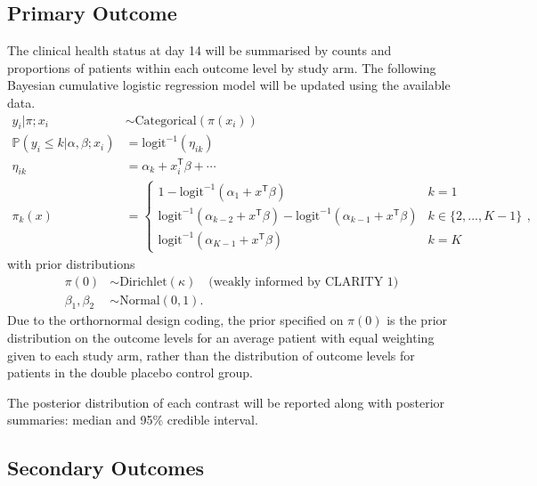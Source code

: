 \documentclass[11pt,parskip=full-]{scrartcl}
\begin{document}
\subsection{Primary Outcome}
The clinical health status at day 14 will be summarised by counts and proportions of patients within each outcome level by study arm. The following Bayesian cumulative logistic regression model will be updated using the available data.
$$
    \begin{aligned}
        y_{i} | \pi;x_i                            & \sim \text{Categorical}(\pi(x_i))           \\
        \mathbb P(y_i \leq k | \alpha, \beta; x_i) & = \text{logit}^{-1}(\eta_{ik})              \\
        \eta_{ik}                                  & = \alpha_k + x_i^{\mathsf{T}}\beta + \cdots \\
        \pi_k(x)                                   & = \begin{cases}
            1 - \text{logit}^{-1}(\alpha_1 + x^\mathsf{T}\beta)                                                       & k=1               \\
            \text{logit}^{-1}(\alpha_{k-2} + x^\mathsf{T}\beta) - \text{logit}^{-1}(\alpha_{k-1} + x^\mathsf{T}\beta) & k\in\{2,...,K-1\} \\
            \text{logit}^{-1}(\alpha_{K-1} + x^\mathsf{T}\beta)                                                       & k=K
        \end{cases},
    \end{aligned}
$$
with prior distributions
$$
    \begin{aligned}
        \pi(0)          & \sim \text{Dirichlet}(\kappa) \quad \text{(weakly informed by CLARITY 1)} \\
        \beta_1,\beta_2 & \sim \text{Normal}(0, 1).
    \end{aligned}
$$
Due to the orthornormal design coding, the prior specified on $\pi(0)$ is the prior distribution on the outcome levels for an average patient with equal weighting given to each study arm, rather than the distribution of outcome levels for patients in the double placebo control group.

The posterior distribution of each contrast will be reported along with posterior summaries: median and 95\% credible interval.

\subsection{Secondary Outcomes}
\end{document}
